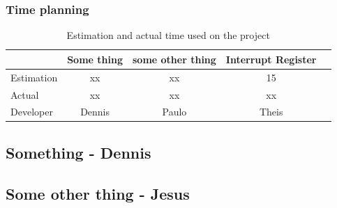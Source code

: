 \subsubsection{Time planning}
\begin{table}[H]
\centering
	\begin{tabular}{|l|c|c|c|c|}
		\hline
		~			& Some thing	& some other thing	& Interrupt Register\\ \hline
		Estimation	& xx			& xx				& 15				\\
		Actual		& xx			& xx				& xx				\\
		Developer	& Dennis		& Paulo				& Theis				\\
		\hline
	\end{tabular}
	\caption{Estimation and actual time used on the project}
\end{table}

\subsection{Something - Dennis}

%
%
%
%
%
%
%
%

\subsection{Some other thing - Jesus}


